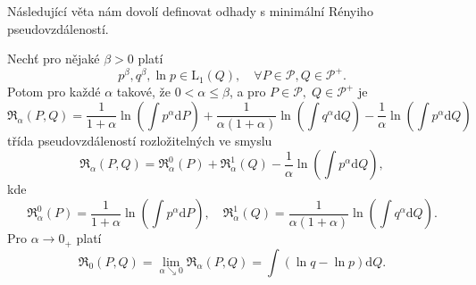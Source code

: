 Následující věta nám dovolí definovat odhady s minimální Rényiho pseudovzdáleností.
\begin{theorem}
Nechť pro nějaké $\beta>0$ platí
	\begin{equation}
			p^\beta, q^\beta,\ln{p} \in \mathrm{L}_1(Q), \quad \forall P \in \mathcal{P}, Q \in \mathcal{P^+}.
			\label{beta-podminka}
	\end{equation}
	Potom pro každé $\alpha$ takové, že $0 < \alpha \leq \beta$, a pro $P \in \mathcal{P}, \; Q \in \mathcal{P^+} $ je 
	\begin{equation}
		\mathfrak{R}_\alpha (P,Q) = \dfrac{1}{1+\alpha}\ln{\left( \int{p^\alpha \mathrm{d}P } \right)} +
		\dfrac{1}{\alpha (1+\alpha)}\ln{\left( \int{q^\alpha \mathrm{d}Q } \right)} -
		\dfrac{1}{\alpha} \ln{\left( \int{p^\alpha \mathrm{d}Q } \right)}
		\label{renyi-pseudovzdalenost}
	\end{equation}
	třída pseudovzdáleností rozložitelných ve smyslu 
	\begin{equation*}
		\mathfrak{R}_\alpha (P,Q) = \mathfrak{R}_\alpha^0 (P) + \mathfrak{R}_\alpha^1 (Q) - \dfrac{1}{\alpha} \ln{\left( \int{p^\alpha \mathrm{d}Q } \right)},
	\end{equation*}	
	kde 
	\begin{equation*}
		\mathfrak{R}_\alpha^0 (P) = \dfrac{1}{1+\alpha}\ln{\left( \int{p^\alpha \mathrm{d}P } \right)}, \quad \mathfrak{R}_\alpha^1 (Q) = \dfrac{1}{\alpha (1+\alpha)}\ln{\left( \int{q^\alpha \mathrm{d}Q } \right)}.
	\end{equation*}
	Pro $\alpha \rightarrow 0_+$ platí
	\begin{equation*}
		\mathfrak{R}_0 (P,Q) = \lim_{\alpha \searrow 0} \mathfrak{R}_\alpha (P,Q) =  \int{\left( \ln{q} - \ln{p} \right)\mathrm{d}Q}.
	\end{equation*}
	\label{renyi-veta}
\end{theorem}

